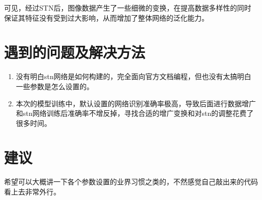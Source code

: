 \documentclass[a4paper]{article}
\begin{document}
\begin{enumerate}
\begin{enumerate}
        可见，经过STN后，图像数据产生了一些细微的变换，在提高数据多样性的同时保证其特征没有受到过大影响，从而增加了整体网络的泛化能力。

    \end{enumerate}

    


\end{enumerate}


\section{遇到的问题及解决方法}
    \begin{enumerate}
        \item 没有明白stn网络是如何构建的，完全面向官方文档编程，但也没有太搞明白一些参数是怎么设置的。
        \item 本次的模型训练中，默认设置的网络识别准确率极高，导致后面进行数据增广和stn网络训练后准确率不增反掉，寻找合适的增广变换和对stn的调整花费了很多时间。
    \end{enumerate}

\section{建议}
希望可以大概讲一下各个参数设置的业界习惯之类的，不然感觉自己敲出来的代码看上去非常外行。
\end{document}
